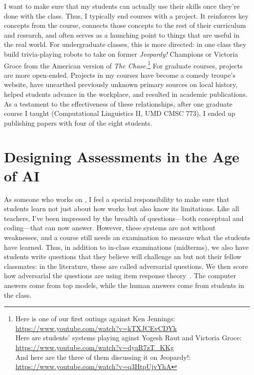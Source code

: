 I want to make sure that my students can actually use their skills
once they're done with the class.  Thus, I typically end courses with
a project.  It reinforces key concepts from the course, connects those
concepts to the rest of their curriculum and research, and often
serves as a launching point to things that are useful in the real
world.  For undergraduate classes, this is more directed: in one class
they build trivia-playing robots to take on former \textit{Jeopardy!} Champions
or Victoria Groce from the American version of \textit{The
  Chase}.\footnote{Here is one of our first outings against Ken
  Jennings: \href{https://www.youtube.com/watch?v=kTXJCEvCDYk}{https://www.youtube.com/watch?v=kTXJCEvCDYk} \\
Here are students' systems playing aginst Yogesh Raut and Victoria
Groce:
\href{https://www.youtube.com/watch?v=dyaR7zT_KKg}{https://www.youtube.com/watch?v=dyaR7zT\_KKg}
\\
And here are the three of them discussing it on Jeopardy!: \href{https://www.youtube.com/watch?v=q3HtpUjvYhA}{https://www.youtube.com/watch?v=q3HtpUjvYhA}}  For
graduate courses, projects are more open-ended.  Projects in my
courses have become a comedy troupe's website, have unearthed
previously unknown primary sources on local history, helped students
advance in the workplace, and resulted in academic publications.  As a
testament to the effectiveness of these relationships, after one
graduate course I taught (Computational Linguistics II, UMD CMSC 773),
I ended up publishing papers with four of the eight students.

\section{Designing Assessments in the Age of AI}

As someone who works on , I feel a special responsibility to
make sure that students learn not just about how  works but
also know its limitations.
%
Like all teachers, I've been impressed by the breadth of
questions---both conceptual and coding---that  can now answer.
%
However, these systems are not without weaknesses, and a course still
needs an examination to measure what the students have learned.
%
Thus, in addition to in-class examinations (midterms), we also have
students write questions that they believe will challenge an 
but not their fellow classmates: in the  literature, these are
called adversarial questions.
%
We then score how adversarial the questions are using item response theory~\cite{Sung:Gor:Fleisig:Mondal:Boyd-Graber-2025}.
%
The computer answers come from top  models, while the human
answers come from students in the class.

